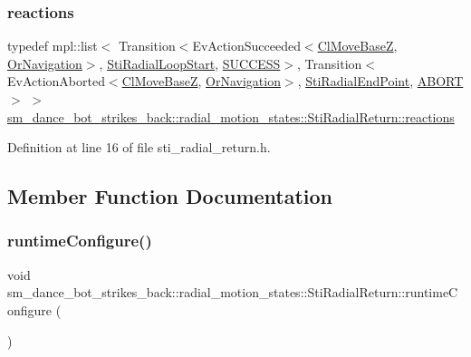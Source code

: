 \subsubsection{\texorpdfstring{reactions}{reactions}}
{\footnotesize\ttfamily typedef mpl\+::list$<$ Transition$<$Ev\+Action\+Succeeded$<$\hyperlink{classmove__base__z__client_1_1ClMoveBaseZ}{Cl\+Move\+BaseZ}, \hyperlink{classsm__dance__bot__strikes__back_1_1OrNavigation}{Or\+Navigation}$>$, \hyperlink{structsm__dance__bot__strikes__back_1_1radial__motion__states_1_1StiRadialLoopStart}{Sti\+Radial\+Loop\+Start}, \hyperlink{classSUCCESS}{S\+U\+C\+C\+E\+SS}$>$, Transition$<$Ev\+Action\+Aborted$<$\hyperlink{classmove__base__z__client_1_1ClMoveBaseZ}{Cl\+Move\+BaseZ}, \hyperlink{classsm__dance__bot__strikes__back_1_1OrNavigation}{Or\+Navigation}$>$, \hyperlink{structsm__dance__bot__strikes__back_1_1radial__motion__states_1_1StiRadialEndPoint}{Sti\+Radial\+End\+Point}, \hyperlink{classABORT}{A\+B\+O\+RT}$>$ $>$ \hyperlink{structsm__dance__bot__strikes__back_1_1radial__motion__states_1_1StiRadialReturn_a5f99f31252e2cbcafad66ec9e9f8b91d}{sm\+\_\+dance\+\_\+bot\+\_\+strikes\+\_\+back\+::radial\+\_\+motion\+\_\+states\+::\+Sti\+Radial\+Return\+::reactions}}



Definition at line 16 of file sti\+\_\+radial\+\_\+return.\+h.



\subsection{Member Function Documentation}
\mbox{\label{structsm__dance__bot__strikes__back_1_1radial__motion__states_1_1StiRadialReturn_ab9c47147170a78be6f81dbc6127fa0d8}} 
\subsubsection{\texorpdfstring{runtime\+Configure()}{runtimeConfigure()}}
{\footnotesize\ttfamily void sm\+\_\+dance\+\_\+bot\+\_\+strikes\+\_\+back\+::radial\+\_\+motion\+\_\+states\+::\+Sti\+Radial\+Return\+::runtime\+Configure (\begin{DoxyParamCaption}{ }\end{DoxyParamCaption})\hspace{0.3cm}{\ttfamily [inline]}}



